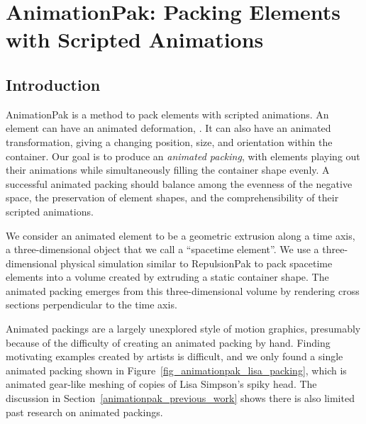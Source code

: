\chapter{AnimationPak: Packing Elements with Scripted Animations}
\label{chapter_animationpak}


\section{Introduction}
\label{animationpak_introduction}


AnimationPak is a method to pack elements with scripted animations.
An element can have an animated deformation, .
It can also have an animated transformation, giving a changing
position, size, and orientation within the container.
Our goal is to produce an \textit{animated packing}, with elements
playing out their animations while simultaneously filling the
container shape evenly.  A successful animated packing should balance
among the evenness of the negative space, the preservation of 
element shapes, and the comprehensibility of their scripted animations.

We consider an animated
element to be a geometric extrusion along a time axis, a three-dimensional
object that we call a ``spacetime element''.  We use a three-dimensional physical simulation
similar to RepulsionPak to pack spacetime
elements into a volume created by extruding a static container shape.
The animated packing emerges from this three-dimensional volume by rendering 
cross sections perpendicular to the time axis.

\newtext
{
Animated packings are a largely unexplored style
of motion graphics, presumably because of the difficulty of creating 
an animated packing by hand.  
Finding motivating examples created by artists is difficult, and
we only found a single animated packing shown in Figure~\ref{fig_animationpak_lisa_packing},
which is animated gear-like meshing of copies of Lisa Simpson's spiky head.
The discussion in Section~\ref{animationpak_previous_work} shows there is also limited past research
on animated packings.
}



